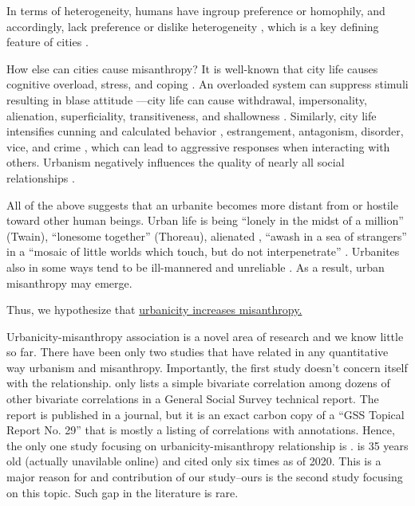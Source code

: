 \documentclass[10pt, letterpaper]{article}
\begin{document}
\begin{spacing}{1.4}
In terms of heterogeneity,  humans have ingroup preference or homophily, and
accordingly, lack preference or dislike heterogeneity
\citep{smith14,mcpherson01,bleidorn16,putnam07}, which is a key defining feature
of cities \citep{wirth38}.

How else can cities cause misanthropy? It is well-known that city life causes cognitive overload, stress, and coping \citep{simmel03, milgram70,lederbogen11}. An overloaded system can suppress stimuli resulting in blase attitude
\citep{simmel03}---city life can cause withdrawal, impersonality, alienation, superficiality, transitiveness, and shallowness \citep{wirth38}. Similarly, city life intensifies cunning and calculated behavior \citep{tonnies57}, estrangement, antagonism, disorder, vice, and crime
\citep{milgram70,park15,park84,bettencourt10b}, which can lead to aggressive
responses when interacting with others. Urbanism negatively influences the quality of nearly all social relationships \cite{wilson85}.

All of the above suggests that an urbanite becomes more distant from or hostile toward other human beings. 
Urban life is being ``lonely in the midst of a million'' (Twain), ``lonesome together''
(Thoreau), alienated \citep{wirth38,nettler1957measure}, ``awash in a sea of strangers''
\citep[Merry cited in][p. 99]{wilson85} in a ``mosaic of little worlds which touch, but do not interpenetrate'' \citep[][p. 40]{park84}.
 Urbanites also in some ways tend to be ill-mannered and unreliable \citep[e.g.,][]{aokCityBook15,aok-sizeFetish17}. As a result, urban misanthropy may emerge.

 Thus, we hypothesize that \underline{urbanicity increases misanthropy.}
 
Urbanicity-misanthropy association  is a novel area of research and we know little so far.
There have been only two studies that have related in any quantitative way
urbanism and misanthropy. Importantly, the first study doesn't concern itself
with the relationship. \citet{smith97} only lists a simple bivariate correlation
among dozens of other bivariate correlations in a General Social Survey
technical report. {The report is published in a journal, but it is an exact
  carbon copy of a ``GSS Topical Report No. 29'' that is mostly a listing of
  correlations with annotations.} Hence, the only one study focusing on
urbanicity-misanthropy relationship is \citet{wilson85}. {\citet{wilson85} is 35
  years old (actually unavilable online) and cited only six times as of
  2020.}%
This is a major reason
for and contribution of our study--ours is the second study focusing on this topic. Such gap in the literature is rare.


\end{spacing}
\end{document}
